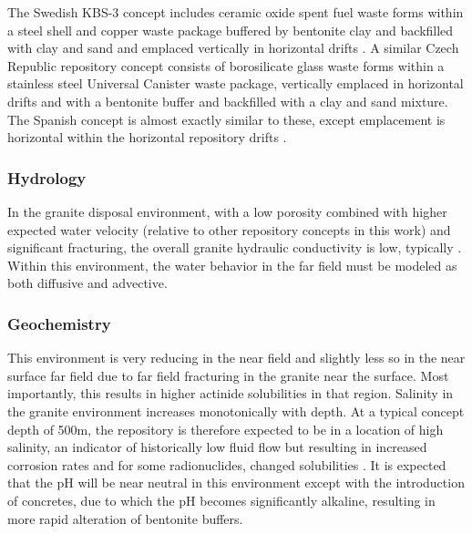 The Swedish KBS-3 concept includes ceramic oxide spent fuel waste forms within a 
steel shell and copper waste package buffered by bentonite clay and backfilled 
with clay and sand and emplaced vertically in horizontal drifts 
\cite{ab_long-term_2006}.
A similar Czech Republic repository concept consists of 
borosilicate glass waste forms within a stainless steel Universal Canister waste 
package, vertically emplaced in horizontal drifts and with a bentonite buffer  
and backfilled with a clay and sand mixture.
The Spanish concept is almost exactly similar to 
these, except emplacement is horizontal within the horizontal repository drifts
\cite{ von_lensa_red-impact_2008}.




\subsubsection{Hydrology}

In the granite disposal environment, with a low porosity combined with 
higher expected water velocity (relative to other repository concepts in this 
work) and significant fracturing, the overall 
granite hydraulic conductivity is low, typically
\cite{schwartz_fundamentals_2004, 
hardin_generic_2011}. Within this environment, the  
water behavior in the far field must be modeled as both diffusive and advective.

\subsubsection{Geochemistry}

This environment is very reducing in the near field and slightly less so in the 
near surface far field due to far field fracturing in the granite near the 
surface. Most importantly, this results in higher actinide solubilities in that 
region. Salinity in the granite environment increases monotonically with depth. 
At a typical concept depth of 500m, the repository is therefore expected to be 
in a location of high salinity, an indicator of historically low fluid flow but 
resulting in increased corrosion rates and for some radionuclides, changed 
solubilities \cite{andra_granite:_2005}.  It is expected that the pH will be 
near neutral in this environment except with  the introduction of concretes, 
due to which the pH becomes significantly alkaline, resulting in more rapid 
alteration of bentonite buffers. 

